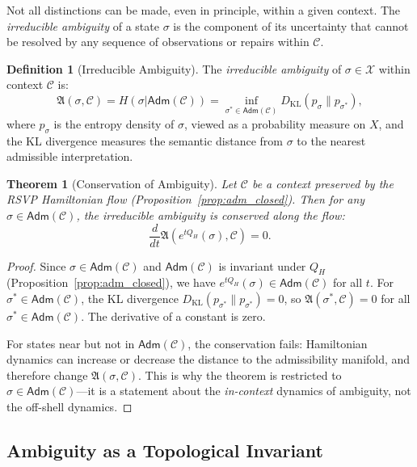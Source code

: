 \documentclass[a4paper,12pt]{article}
\newtheorem{theorem}{Theorem}[section]
\theoremstyle{definition}
\newtheorem{definition}{Definition}[section]
\newcommand{\X}{\mathcal{X}}
\newcommand{\Adm}{\mathsf{Adm}}
\newcommand{\Amb}{\mathfrak{A}}
\begin{document}
Not all distinctions can be made, even in principle, within a given context. The \emph{irreducible ambiguity} of a state $\sigma$ is the component of its uncertainty that cannot be resolved by any sequence of observations or repairs within $\mathcal{C}$.

\begin{definition}[Irreducible Ambiguity]
\label{def:ambiguity}
The \emph{irreducible ambiguity} of $\sigma \in \X$ within context $\mathcal{C}$ is:
\[
\Amb(\sigma, \mathcal{C}) = H(\sigma | \Adm(\mathcal{C})) = \inf_{\sigma^* \in \Adm(\mathcal{C})} D_{\mathrm{KL}}(p_\sigma \| p_{\sigma^*}),
\]
where $p_\sigma$ is the entropy density of $\sigma$, viewed as a probability measure on $X$, and the KL divergence measures the semantic distance from $\sigma$ to the nearest admissible interpretation.
\end{definition}

\begin{theorem}[Conservation of Ambiguity]
\label{thm:conservation}
Let $\mathcal{C}$ be a context preserved by the RSVP Hamiltonian flow (Proposition~\ref{prop:adm_closed}). Then for any $\sigma \in \Adm(\mathcal{C})$, the irreducible ambiguity is conserved along the flow:
\[
\frac{d}{dt} \Amb(e^{tQ_H}(\sigma), \mathcal{C}) = 0.
\]
\end{theorem}

\begin{proof}
Since $\sigma \in \Adm(\mathcal{C})$ and $\Adm(\mathcal{C})$ is invariant under $Q_H$ (Proposition~\ref{prop:adm_closed}), we have $e^{tQ_H}(\sigma) \in \Adm(\mathcal{C})$ for all $t$. For $\sigma^* \in \Adm(\mathcal{C})$, the KL divergence $D_{\mathrm{KL}}(p_{\sigma^*} \| p_{\sigma^*}) = 0$, so $\Amb(\sigma^*, \mathcal{C}) = 0$ for all $\sigma^* \in \Adm(\mathcal{C})$. The derivative of a constant is zero.

For states near but not in $\Adm(\mathcal{C})$, the conservation fails: Hamiltonian dynamics can increase or decrease the distance to the admissibility manifold, and therefore change $\Amb(\sigma, \mathcal{C})$. This is why the theorem is restricted to $\sigma \in \Adm(\mathcal{C})$—it is a statement about the \emph{in-context} dynamics of ambiguity, not the off-shell dynamics.
\end{proof}

\subsection{Ambiguity as a Topological Invariant}
\end{document}
